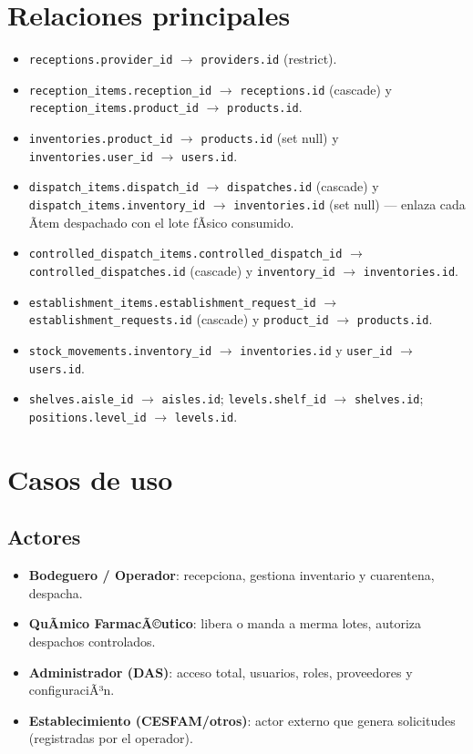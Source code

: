 ﻿\documentclass[a4paper, 12pt]{article}
\begin{document}
\section{Relaciones principales}
\begin{itemize}
    \item \texttt{receptions.provider\_id} $\to$ \texttt{providers.id} (restrict).
    \item \texttt{reception\_items.reception\_id} $\to$ \texttt{receptions.id} (cascade) y \texttt{reception\_items.product\_id} $\to$ \texttt{products.id}.
    \item \texttt{inventories.product\_id} $\to$ \texttt{products.id} (set null) y \texttt{inventories.user\_id} $\to$ \texttt{users.id}.
    \item \texttt{dispatch\_items.dispatch\_id} $\to$ \texttt{dispatches.id} (cascade) y \texttt{dispatch\_items.inventory\_id} $\to$ \texttt{inventories.id} (set null) --- enlaza cada Ã­tem despachado con el lote fÃ­sico consumido.
    \item \texttt{controlled\_dispatch\_items.controlled\_dispatch\_id} $\to$ \texttt{controlled\_dispatches.id} (cascade) y \texttt{inventory\_id} $\to$ \texttt{inventories.id}.
    \item \texttt{establishment\_items.establishment\_request\_id} $\to$ \texttt{establishment\_requests.id} (cascade) y \texttt{product\_id} $\to$ \texttt{products.id}.
    \item \texttt{stock\_movements.inventory\_id} $\to$ \texttt{inventories.id} y \texttt{user\_id} $\to$ \texttt{users.id}.
    \item \texttt{shelves.aisle\_id} $\to$ \texttt{aisles.id}; \texttt{levels.shelf\_id} $\to$ \texttt{shelves.id}; \texttt{positions.level\_id} $\to$ \texttt{levels.id}.
\end{itemize}

\section{Casos de uso}

\subsection{Actores}
\begin{itemize}
    \item \textbf{Bodeguero / Operador}: recepciona, gestiona inventario y cuarentena, despacha.
    \item \textbf{QuÃ­mico FarmacÃ©utico}: libera o manda a merma lotes, autoriza despachos controlados.
    \item \textbf{Administrador (DAS)}: acceso total, usuarios, roles, proveedores y configuraciÃ³n.
    \item \textbf{Establecimiento (CESFAM/otros)}: actor externo que genera solicitudes (registradas por el operador).
\end{itemize}
\end{document}
